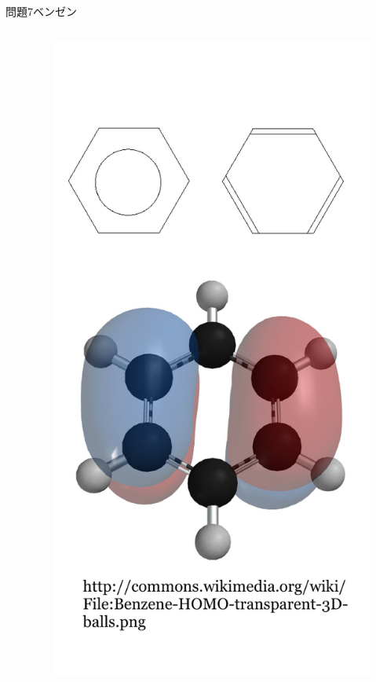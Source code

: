 \documentclass[dvipdfmx]{beamer}
\begin{document}
\begin{frame}{問題7}{ベンゼン}
\begin{columns}[t]
\begin{column}{0.7\textwidth}
\end{column}
\begin{column}{0.3\textwidth}
\begin{figure}[htbp]
    \centering
    \includegraphics[bb=0mm 0mm 100.0mm 170.0mm, scale=0.35, type=pdf]{img/problem7.pdf}
\end{figure}
\end{column}
\end{columns}
\end{frame}
\end{document}
